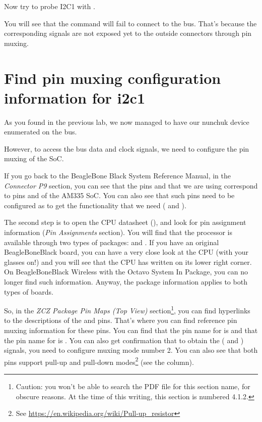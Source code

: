 Now try to probe I2C1 with .

You will see that the command will fail to connect to
the bus. That's because the corresponding signals are
not exposed yet to the outside connectors through pin muxing.

\section{Find pin muxing configuration information for i2c1}

As you found in the previous lab, we now managed to have our nunchuk
device enumerated on the  bus.

However, to access the bus data and clock signals, we need to configure
the pin muxing of the SoC.

If you go back to the BeagleBone Black System Reference Manual, in the
{\em Connector P9} section, you can see that the pins  and
 that we are using correspond to pins  and 
of the AM335 SoC. You can also see that such pins need to be configured
as  to get the functionality that we need (
and ).

The second step is to open the CPU datasheet (), and
look for pin assignment information ({\em Pin Assignments} section).
You will find that the processor is available through two types of
packages:  and . If you have an original
BeagleBoneBlack board, you can have a very close look at the CPU
(with your glasses on!) and you will see that the CPU has  written
on its lower right corner. On BeagleBoneBlack Wireless with the
Octavo System In Package, you can no longer find such information.
Anyway, the  package information applies to both types of
boards.

So, in the {\em ZCZ Package Pin Maps (Top View)} section\footnote{Caution: you
won't be able to search the PDF file for this section name, for obscure
reasons. At the time of this writing, this section is numbered 4.1.2.}, you can find
hyperlinks to the descriptions of the  and  pins.
That's where you can find reference pin muxing information for these
pins.  You can find that the pin name for  is 
and that the pin name for  is .
You can also get confirmation that to obtain the ( and
) signals, you need to configure muxing mode number 2.
You can also see that both pins support pull-up and pull-down
modes\footnote{See \url{https://en.wikipedia.org/wiki/Pull-up_resistor}}
(see the  column).

